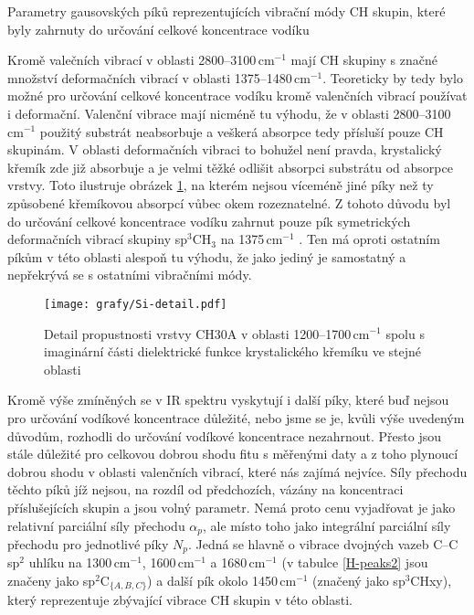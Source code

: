 \begin{table}[tb]
 \centering
	\renewcommand{\tabcolsep}{2pt}
 
 \caption{Parametry gausovských píků reprezentujících vibrační módy CH skupin, které byly zahrnuty do určování celkové koncentrace vodíku}
\label{H-peaks}
\end{table}

Kromě valečních vibrací v oblasti 2800--3100\,cm$^{-1}$ mají CH skupiny s značné množství deformačních vibrací v oblasti 1375--1480\,cm$^{-1}$. Teoreticky by tedy bylo možné pro určování celkové koncentrace vodíku kromě valenčních vibrací používat i deformační. Valenční vibrace mají nicméně tu výhodu, že v oblasti 2800--3100\,cm$^{-1}$ použitý substrát neabsorbuje a veškerá absorpce tedy přísluší pouze CH skupinám. 
V oblasti deformačních vibraci to bohužel není pravda, krystalický křemík zde již absorbuje a je velmi těžké odlišit absorpci substrátu od absorpce vrstvy. Toto ilustruje obrázek \ref{Si-detail}, na kterém nejsou víceméně jiné píky než ty způsobené křemíkovou absorpcí vůbec okem rozeznatelné. Z tohoto důvodu byl do určování celkové koncentrace vodíku zahrnut pouze pík symetrických deformačních vibrací skupiny sp$^3$CH$_3$ na 1375\,cm$^{-1}$ \cite{Robertson2002}. Ten má oproti ostatním píkům v této oblasti alespoň tu výhodu, že jako jediný je samostatný a nepřekrývá se s ostatními vibračními módy.

\begin{figure}[tb]
	\texttt{[image: grafy/Si-detail.pdf]}
	\caption{Detail propustnosti vrstvy CH30A v oblasti 1200--1700\,cm$^{-1}$ spolu s ima\-gi\-nární části dielektrické funkce krystalického křemíku ve stejné oblasti}
	\label{Si-detail}
\end{figure}

Kromě výše zmíněných se v IR spektru vyskytují i další píky, které buď nejsou pro určování vodíkové koncentrace důležité, nebo jsme se je, kvůli výše uvedeným důvodům, rozhodli do určování vodíkové koncentrace nezahrnout. Přesto jsou stále důležité pro celkovou dobrou shodu fitu s měřenými daty a z toho plynoucí dobrou shodu v oblasti valenčních vibrací, které nás zajímá nejvíce. Síly přechodu těchto píků jíž nejsou, na rozdíl od předchozích, vázány na koncentraci příslušejících skupin a jsou volný parametr. 
Nemá proto cenu vyjadřovat je jako relativní parciální síly přechodu $\alpha_p$, ale místo toho jako integrální parciální síly přechodu pro jednotlivé píky $N_p$. Jedná se hlavně o vibrace dvojných vazeb C--C sp$^2$ uhlíku na 1300\,cm$^{-1}$, 1600\,cm$^{-1}$ a 1680\,cm$^{-1}$ \cite{Robertson2002, Theye2001, Zajickova2011} (v tabulce \ref{H-peaks2} jsou značeny jako sp$^2$C$_{\{A,B,C\}}$) a další pík okolo 1450\,cm$^{-1}$ (značený jako sp$^3$CHxy), který reprezentuje zbývající vibrace CH skupin v této oblasti.

